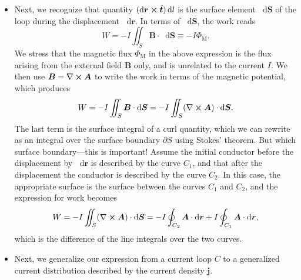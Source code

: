 \documentclass[11pt, a4paper]{article}
\newcommand{\diff}{\mathop{}\!\mathrm{d}} %
\renewcommand{\vec}[1]{\bm{#1}} %
\newcommand{\uvec}[1]{\hat{\vec{#1}}} %
\renewcommand{\r}{\vec{r}}
\newcommand{\B}{\vec{B}} %
\newcommand{\A}{\vec{A}} %
\renewcommand{\j}{\vec{j}}  %
\renewcommand{\curl}{\nabla \cross}
\begin{document}
\begin{itemize}
    \item Next, we recognize that quantity $ (\diff \r \cross \uvec{t}) \diff l $ is the surface element $ \diff \vec{S} $  of the loop during the displacement $ \diff \r $. In terms of $ \diff \vec{S} $, the work reads
	\begin{equation*}
		W = - I \iint_{S} \B \cdot \diff \vec{S} \equiv - I \Phi_{\text{M}}.
	\end{equation*}
    We stress that the magnetic flux $ \Phi_{\text{M}} $ in the above expression is the flux arising from the external field $ \B $ only, and is unrelated to the current $ I $. We then use $ \B = \curl \A $ to write the work in terms of the magnetic potential, which produces
	\begin{equation*}
		W = - I \iint_{S}\B \cdot \diff \vec{S} = - I \iint_{S} (\curl \A) \cdot \diff \vec{S}.
	\end{equation*}
	The last term is the surface integral of a curl quantity, which we can rewrite as an integral over the surface boundary $ \partial S $ using Stokes' theorem. But which surface boundary---this is important! Assume the initial conductor before the displacement by $ \diff \r $ is described by the curve $ C_{1} $, and that after the displacement the conductor is described by the curve $ C_{2} $. In this case, the appropriate surface is the surface between the curves $ C_{1} $ and $ C_{2} $, and the expression for work becomes
	\begin{equation*}
        W = - I \iint_{S} (\curl \A) \cdot \diff \vec{S} = - I \oint_{C_{2}} \A \cdot \diff \r  + I \oint_{C_{1}} \A \cdot \diff \r,
	\end{equation*}
	which is the difference of the line integrals over the two curves.
	
	\item Next, we generalize our expression from a current loop $ C $ to a generalized current distribution described by the current density $ \j $. 


\end{itemize}
\end{document}

